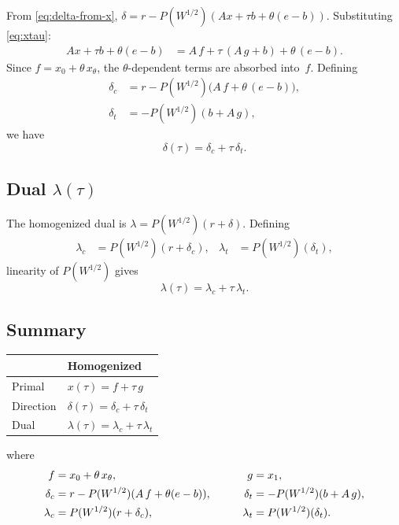 \documentclass{article}
\newcommand{\PW}{P(W^{1/2})}
\begin{document}
From \eqref{eq:delta-from-x},
$\delta = r - \PW(Ax + \tau b + \theta(e-b))$.
Substituting \eqref{eq:xtau}:
\begin{align*}
  Ax + \tau b + \theta(e-b)
  &= A\,f + \tau\,(A\,g + b) + \theta\,(e - b).
\end{align*}
Since $f = x_0 + \theta\,x_\theta$, the $\theta$-dependent terms
are absorbed into~$f$.  Defining
\begin{align}
  \delta_c &= r - \PW\bigl(A\,f + \theta\,(e-b)\bigr), \label{eq:delta-center}\\
  \delta_t &= -\PW(b + A\,g), \label{eq:delta-cost}
\end{align}
we have
\begin{equation}\label{eq:delta-tau}
  \boxed{\delta(\tau) = \delta_c + \tau\,\delta_t.}
\end{equation}

\subsection{Dual $\lambda(\tau)$}

The homogenized dual is $\lambda = \PW(r + \delta)$.
Defining
\begin{align}
  \lambda_c &= \PW(r + \delta_c), &
  \lambda_t &= \PW(\delta_t), \label{eq:lambda-ct}
\end{align}
linearity of $\PW$ gives
\begin{equation}\label{eq:lambda-tau}
  \boxed{\lambda(\tau) = \lambda_c + \tau\,\lambda_t.}
\end{equation}

\subsection{Summary}

\begin{center}
\renewcommand{\arraystretch}{1.4}
\begin{tabular}{ll}
\hline
  & \textbf{Homogenized} \\
\hline
Primal & $x(\tau) = f + \tau\,g$ \\
Direction & $\delta(\tau) = \delta_c + \tau\,\delta_t$ \\
Dual & $\lambda(\tau) = \lambda_c + \tau\,\lambda_t$ \\
\hline
\end{tabular}
\end{center}
where
\begin{alignat}{2}
  f &= x_0 + \theta\,x_\theta, &\qquad g &= x_1, \notag\\
  \delta_c &= r - \PW(A\,f + \theta(e-b)), &\qquad
  \delta_t &= -\PW(b + A\,g), \notag\\
  \lambda_c &= \PW(r + \delta_c), &\qquad
  \lambda_t &= \PW(\delta_t). \notag
\end{alignat}
\end{document}
